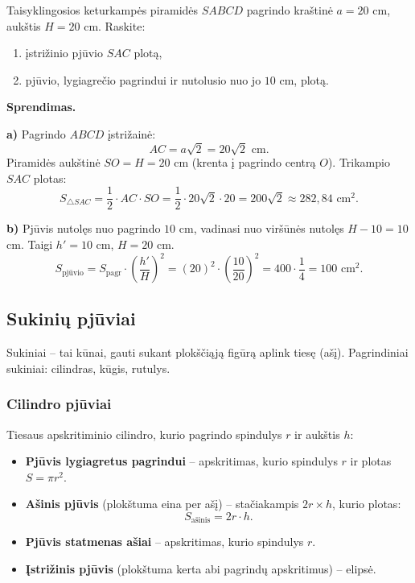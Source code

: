 \begin{example}
Taisyklingosios keturkampės piramidės $SABCD$ pagrindo kraštinė $a = 20$ cm, aukštis $H = 20$ cm. Raskite:
\begin{enumerate}[label=\alph*)]
    \item įstrižinio pjūvio $SAC$ plotą,
    \item pjūvio, lygiagrečio pagrindui ir nutolusio nuo jo $10$ cm, plotą.
\end{enumerate}

\textbf{Sprendimas.}

\textbf{a)} Pagrindo $ABCD$ įstrižainė:
\[
AC = a\sqrt{2} = 20\sqrt{2} \text{ cm}.
\]
Piramidės aukštinė $SO = H = 20$ cm (krenta į pagrindo centrą $O$). Trikampio $SAC$ plotas:
\[
S_{\triangle SAC} = \frac{1}{2} \cdot AC \cdot SO = \frac{1}{2} \cdot 20\sqrt{2} \cdot 20 = 200\sqrt{2} \approx 282{,}84 \text{ cm}^2.
\]

\textbf{b)} Pjūvis nutolęs nuo pagrindo $10$ cm, vadinasi nuo viršūnės nutolęs $H - 10 = 10$ cm. Taigi $h' = 10$ cm, $H = 20$ cm.
\[
S_{\text{pjūvio}} = S_{\text{pagr}} \cdot \left(\frac{h'}{H}\right)^2 = (20)^2 \cdot \left(\frac{10}{20}\right)^2 = 400 \cdot \frac{1}{4} = 100 \text{ cm}^2.
\]
\end{example}

\subsection{Sukinių pjūviai}

Sukiniai – tai kūnai, gauti sukant plokščiąją figūrą aplink tiesę (ašį). Pagrindiniai sukiniai: cilindras, kūgis, rutulys.

\subsubsection{Cilindro pjūviai}

Tiesaus apskritiminio cilindro, kurio pagrindo spindulys $r$ ir aukštis $h$:

\begin{itemize}
    \item \textbf{Pjūvis lygiagretus pagrindui} – apskritimas, kurio spindulys $r$ ir plotas $S = \pi r^2$.
    \item \textbf{Ašinis pjūvis} (plokštuma eina per ašį) – stačiakampis $2r \times h$, kurio plotas:
    \[
    S_{\text{ašinis}} = 2r \cdot h.
    \]
    \item \textbf{Pjūvis statmenas ašiai} – apskritimas, kurio spindulys $r$.
    \item \textbf{Įstrižinis pjūvis} (plokštuma kerta abi pagrindų apskritimus) – elipsė.
\end{itemize}

